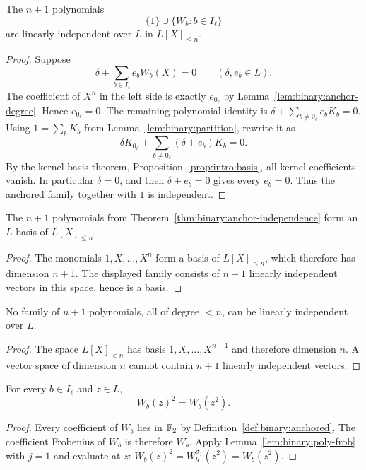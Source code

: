 \begin{theorem}\label{thm:binary:anchor-independence}
The $n+1$ polynomials
\[
 \boxed{\{1\}\cup\{W_b:b\in I_\ell\}}
\]
are linearly independent over $L$ in $L[X]_{\leq n}$.
\end{theorem}
\begin{proof}
Suppose
\[
 \delta+\sum_{b\in I_\ell}e_bW_b(X)=0
 \qquad(\delta,e_b\in L).
\]
The coefficient of $X^n$ in the left side is
exactly $e_{0_\ell}$ by Lemma~\ref{lem:binary:anchor-degree}.
Hence $e_{0_\ell}=0$. The remaining polynomial identity is
$\delta+\sum_{b\neq0_\ell}e_bK_b=0$.
Using $1=\sum_bK_b$ from
Lemma~\ref{lem:binary:partition}, rewrite it as
\[
 \delta K_{0_\ell}
 +\sum_{b\neq0_\ell}(\delta+e_b)K_b=0.
\]
By the kernel basis theorem,
Proposition~\ref{prop:intro:basis},
all kernel coefficients vanish. In particular $\delta=0$,
and then $\delta+e_b=0$ gives every $e_b=0$.
Thus the anchored family together with $1$ is independent.
\end{proof}

\begin{corollary}\label{cor:binary:anchor-basis}
The $n+1$ polynomials from
Theorem~\ref{thm:binary:anchor-independence}
form an $L$-basis of $L[X]_{\leq n}$.
\end{corollary}
\begin{proof}
The monomials $1,X,\ldots,X^n$ form a basis of
$L[X]_{\leq n}$, which therefore has dimension $n+1$.
The displayed family consists of $n+1$ linearly
independent vectors in this space, hence is a basis.
\end{proof}

\begin{proposition}\label{prop:binary:anchor-minimal}
No family of $n+1$ polynomials, all of degree $<n$,
can be linearly independent over $L$.
\end{proposition}
\begin{proof}
The space $L[X]_{<n}$ has basis
$1,X,\ldots,X^{n-1}$ and therefore dimension $n$.
A vector space of dimension $n$ cannot contain $n+1$
linearly independent vectors.
\end{proof}

\begin{lemma}\label{lem:binary:anchor-frob}
For every $b\in I_\ell$ and $z\in L$,
\[
 W_b(z)^2=W_b(z^2).
\]
\end{lemma}
\begin{proof}
Every coefficient of $W_b$ lies in $\mathbb{F}_2$
by Definition~\ref{def:binary:anchored}.
The coefficient Frobenius of $W_b$ is therefore $W_b$.
Apply Lemma~\ref{lem:binary:poly-frob} with $j=1$
and evaluate at $z$:
$W_b(z)^2=W_b^{\sigma_1}(z^2)=W_b(z^2)$.
\end{proof}

